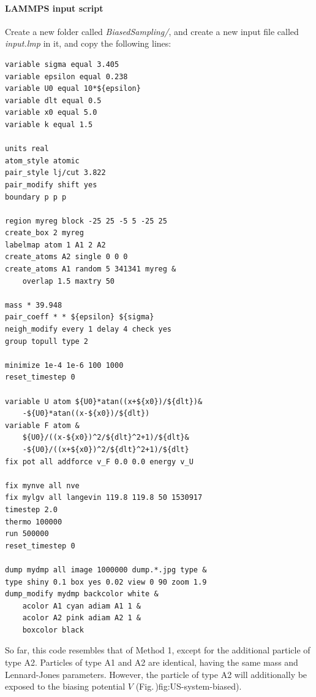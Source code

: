 \documentclass[9pt,tutorial]{livecoms}
\begin{document}
\paragraph{LAMMPS input script}
Create a new folder called \textit{BiasedSampling/}, and create a new input file
called \textit{input.lmp} in it, and copy the following lines:
{\normalsize \begin{verbatim}
variable sigma equal 3.405
variable epsilon equal 0.238
variable U0 equal 10*${epsilon}
variable dlt equal 0.5
variable x0 equal 5.0
variable k equal 1.5

units real
atom_style atomic
pair_style lj/cut 3.822
pair_modify shift yes
boundary p p p

region myreg block -25 25 -5 5 -25 25
create_box 2 myreg
labelmap atom 1 A1 2 A2
create_atoms A2 single 0 0 0
create_atoms A1 random 5 341341 myreg &
    overlap 1.5 maxtry 50

mass * 39.948
pair_coeff * * ${epsilon} ${sigma}
neigh_modify every 1 delay 4 check yes
group topull type 2

minimize 1e-4 1e-6 100 1000
reset_timestep 0

variable U atom ${U0}*atan((x+${x0})/${dlt})&
    -${U0}*atan((x-${x0})/${dlt})
variable F atom &
    ${U0}/((x-${x0})^2/${dlt}^2+1)/${dlt}&
    -${U0}/((x+${x0})^2/${dlt}^2+1)/${dlt}
fix pot all addforce v_F 0.0 0.0 energy v_U

fix mynve all nve
fix mylgv all langevin 119.8 119.8 50 1530917
timestep 2.0
thermo 100000
run 500000
reset_timestep 0

dump mydmp all image 1000000 dump.*.jpg type &
type shiny 0.1 box yes 0.02 view 0 90 zoom 1.9
dump_modify mydmp backcolor white &
    acolor A1 cyan adiam A1 1 &
    acolor A2 pink adiam A2 1 &
    boxcolor black
\end{verbatim}}
So far, this code resembles that of Method 1, except for the additional particle
of type A2. Particles of type A1 and A2
are identical, having the same mass and Lennard-Jones parameters. However, the
particle of type A2 will additionally be exposed to the biasing potential
$V$ (Fig.\,){fig:US-system-biased}).
\end{document}
